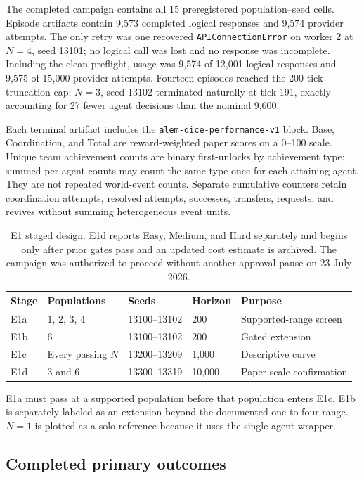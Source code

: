 \documentclass[11pt]{article}
\newcommand{\code}[1]{\texttt{#1}}
\begin{document}
The completed campaign contains all 15 preregistered population--seed cells.
Episode artifacts contain 9,573 completed logical responses and 9,574 provider
attempts.  The only retry was one recovered \code{APIConnectionError} on worker
2 at $N=4$, seed 13101; no logical call was lost and no response was
incomplete.  Including the clean preflight, usage was 9,574 of 12,001 logical
responses and 9,575 of 15,000 provider attempts.  Fourteen episodes reached
the 200-tick truncation cap; $N=3$, seed 13102 terminated naturally at tick
191, exactly accounting for 27 fewer agent decisions than the nominal 9,600.

Each terminal artifact includes the
\code{alem-dice-performance-v1} block.  Base, Coordination, and Total are
reward-weighted paper scores on a 0--100 scale.  Unique team achievement counts
are binary first-unlocks by achievement type; summed per-agent counts may count
the same type once for each attaining agent.  They are not repeated world-event
counts.  Separate cumulative counters retain coordination attempts, resolved
attempts, successes, transfers, requests, and revives without summing
heterogeneous event units.

\begin{table}[ht]
\centering
\small
\begin{tabular}{@{}lllll@{}}
\toprule
Stage & Populations & Seeds & Horizon & Purpose\\
\midrule
E1a & 1, 2, 3, 4 & 13100--13102 & 200 & Supported-range screen\\
E1b & 6 & 13100--13102 & 200 & Gated extension\\
E1c & Every passing $N$ & 13200--13209 & 1,000 & Descriptive curve\\
E1d & 3 and 6 & 13300--13319 & 10,000 & Paper-scale confirmation\\
\bottomrule
\end{tabular}
\caption{E1 staged design.  E1d reports Easy, Medium, and Hard separately and
begins only after prior gates pass and an updated cost estimate is archived.
The campaign was authorized to proceed without another approval pause on
23 July 2026.}
\label{tab:e1-design}
\end{table}

E1a must pass at a supported population before that population enters E1c.
E1b is separately labeled as an extension beyond the documented one-to-four
range.  $N=1$ is plotted as a solo reference because it uses the single-agent
wrapper.

\subsection{Completed primary outcomes}
\end{document}
